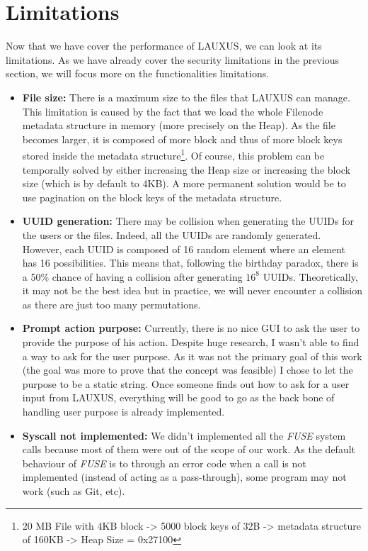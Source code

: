 \documentclass[../main.tex]{subfiles}
\begin{document}
\section{Limitations}
\label{section:analysis:limitations}
\par Now that we have cover the performance of LAUXUS, we can look at its limitations. As we have already cover the security limitations in the previous section, we will focus more on the functionalities limitations.
\begin{itemize}
    \item \textbf{File size:} There is a maximum size to the files that LAUXUS can manage. This limitation is caused by the fact that we load the whole Filenode metadata structure in memory (more precisely on the Heap). As the file becomes larger, it is composed of more block and thus of more block keys stored inside the metadata structure\footnote{20 MB File with 4KB block -> 5000 block keys of 32B -> metadata structure of 160KB -> Heap Size = 0x27100}. Of course, this problem can be temporally solved by either increasing the Heap size or increasing the block size (which is by default to 4KB). A more permanent solution would be to use pagination on the block keys of the metadata structure.
    \item \textbf{UUID generation:} There may be collision when generating the UUIDs for the users or the files. Indeed, all the UUIDs are randomly generated. However, each UUID is composed of 16 random element where an element has 16 possibilities. This means that, following the birthday paradox, there is a 50\% chance of having a collision after generating $16^8$ UUIDs. Theoretically, it may not be the best idea but in practice, we will never encounter a collision as there are just too many permutations.
    \item \textbf{Prompt action purpose:} Currently, there is no nice GUI to ask the user to provide the purpose of his action. Despite huge research, I wasn't able to find a way to ask for the user purpose. As it was not the primary goal of this work (the goal was more to prove that the concept was feasible) I chose to let the purpose to be a static string. Once someone finds out how to ask for a user input from LAUXUS, everything will be good to go as the back bone of handling user purpose is already implemented.
    \item \textbf{Syscall not implemented:} We didn't implemented all the \textit{FUSE} system calls because most of them were out of the scope of our work. As the default behaviour of \textit{FUSE} is to through an error code when a call is not implemented (instead of acting as a pass-through), some program may not work (such as Git, etc).

\end{itemize}
\end{document}
